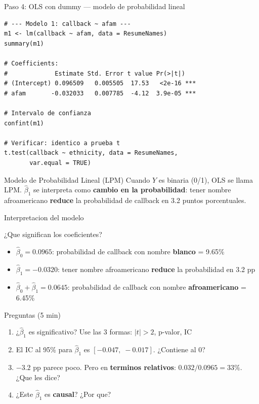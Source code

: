 \documentclass[aspectratio=169, 11pt]{beamer}
\begin{document}
\begin{frame}[fragile]{Paso 4: OLS con dummy --- modelo de probabilidad lineal}
\begin{lstlisting}[basicstyle=\ttfamily\scriptsize]
# --- Modelo 1: callback ~ afam ---
m1 <- lm(callback ~ afam, data = ResumeNames)
summary(m1)

# Coefficients:
#             Estimate Std. Error t value Pr(>|t|)
# (Intercept) 0.096509   0.005505  17.53   <2e-16 ***
# afam       -0.032033   0.007785  -4.12  3.9e-05 ***

# Intervalo de confianza
confint(m1)

# Verificar: identico a prueba t
t.test(callback ~ ethnicity, data = ResumeNames,
       var.equal = TRUE)
\end{lstlisting}

\vspace{0.1cm}
\begin{block}{Modelo de Probabilidad Lineal (LPM)}
\small Cuando $Y$ es binaria (0/1), OLS se llama LPM. $\hat{\beta}_1$ se interpreta como \textbf{cambio en la probabilidad}: tener nombre afroamericano \textbf{reduce} la probabilidad de callback en 3.2 puntos porcentuales.
\end{block}
\end{frame}

\begin{frame}{Interpretacion del modelo}
\small
\begin{block}{¿Que significan los coeficientes?}
\begin{itemize}\setlength{\itemsep}{3pt}
  \item $\hat{\beta}_0 = 0.0965$: probabilidad de callback con nombre \textbf{blanco} = 9.65\%
  \item $\hat{\beta}_1 = -0.0320$: tener nombre afroamericano \textbf{reduce} la probabilidad en 3.2 pp
  \item $\hat{\beta}_0 + \hat{\beta}_1 = 0.0645$: probabilidad de callback con nombre \textbf{afroamericano} = 6.45\%
\end{itemize}
\end{block}

\vspace{0.2cm}
\begin{alertblock}{Preguntas (5 min)}
\begin{enumerate}\setlength{\itemsep}{2pt}
  \item ¿$\hat{\beta}_1$ es significativo? Use las 3 formas: $|t| > 2$, p-valor, IC
  \item El IC al 95\% para $\hat{\beta}_1$ es $[-0.047,\; -0.017]$. ¿Contiene al 0?
  \item $-3.2$ pp parece poco. Pero en \textbf{terminos relativos}: $0.032/0.0965 = 33\%$. ¿Que les dice?
  \item ¿Este $\hat{\beta}_1$ es \textbf{causal}? ¿Por que?
\end{enumerate}
\end{alertblock}
\end{frame}
\end{document}
